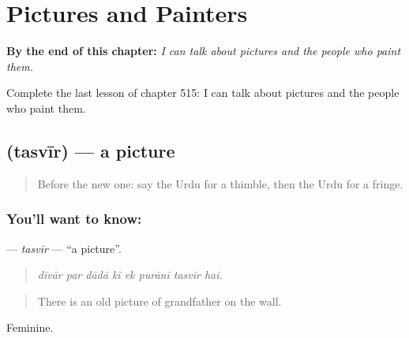 
\chapter{Pictures and Painters}
\label{ch:ur-pictures-and-painters}

\begin{chapteropening}
\textbf{By the end of this chapter:} \emph{I can talk about pictures and the people who paint them.}

Complete the last lesson of chapter 515: I can talk about pictures and the people who paint them.
\end{chapteropening}

\section[\texorpdfstring{\ur{تصویر} (tasvīr)}{تصویر (tasvīr)}]{ (tasvīr) — a picture}

\label{lesson:UR-C515-tasvir}



\begin{quote}
Before the new one: say the Urdu for a thimble, then the Urdu for a fringe.
\end{quote}

\subsection*{You'll want to know: }
\textbf{} — \emph{tasvīr} — \textquotedblleft{}a picture\textquotedblright{}.

\begin{quote}
       
\end{quote}

\begin{quote}
\emph{dīvār par dādā kī ek purānī tasvīr hai.}
\end{quote}

\begin{quote}
There is an old picture of grandfather on the wall.
\end{quote}

Feminine.

